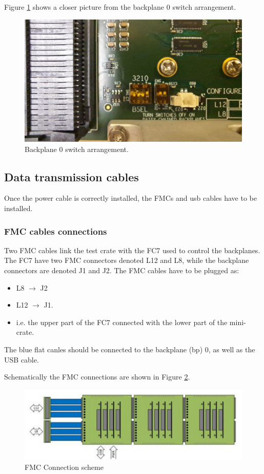 \documentclass[10pt,a4paper]{article}
\begin{document}
Figure \ref{BackPlane0Switch} shows a closer picture from the backplane 0 switch arrangement. 

\begin{figure}[h!]
 \includegraphics[width=\linewidth]{Pictures/backplane0_pin_positions.jpg} 
  \caption{Backplane 0 switch arrangement.}
  \label{BackPlane0Switch}
\end{figure}

\subsection{Data transmission cables}
Once the power cable is correctly installed, the FMCs and usb cables have to be installed.
\subsubsection{FMC cables connections}
Two FMC cables link the test crate with the FC7 used to control the backplanes. The FC7 have two FMC connectors denoted L12 and L8, while the backplane connectors are denoted J1 and J2. The FMC cables have to be plugged as:
\begin{itemize}
\item L8 $\rightarrow$ J2
\item L12 $\rightarrow$ J1.
\item i.e. the upper part of the FC7 connected with the lower part of the mini-crate.
\end{itemize}
The blue flat canles should be connected to the backplane (bp) 0, as well as the USB cable. 

Schematically the FMC connections are shown in Figure \ref{FMCConnection}.
\begin{figure}[h!]
 \includegraphics[width=\linewidth]{FMCScheme.png} 
  \caption{FMC Connection scheme}
  \label{FMCConnection}
\end{figure}
\end{document}
